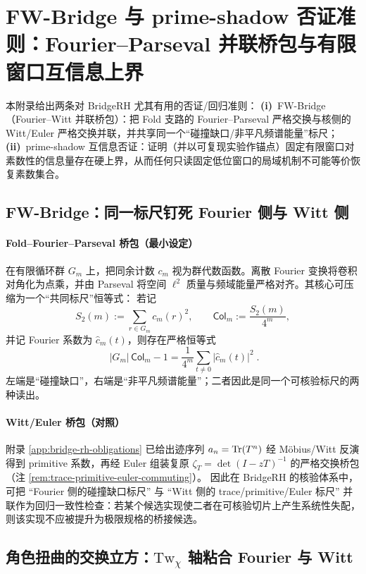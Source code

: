 \section{FW-Bridge 与 prime-shadow 否证准则：Fourier--Parseval 并联桥包与有限窗口互信息上界}\label{app:fw-bridge-and-prime-shadow}

本附录给出两条对 BridgeRH 尤其有用的否证/回归准则：
\textbf{(i)}~FW-Bridge（Fourier--Witt 并联桥包）：把 Fold 支路的 Fourier--Parseval 严格交换与核侧的 Witt/Euler 严格交换并联，并共享同一个“碰撞缺口/非平凡频谱能量”标尺；
\textbf{(ii)}~prime-shadow 互信息否证：证明（并以可复现实验作锚点）固定有限窗口对素数性的信息量存在硬上界，从而任何只读固定低位窗口的局域机制不可能等价恢复素数集合。

\subsection{FW-Bridge：同一标尺钉死 Fourier 侧与 Witt 侧}\label{subsec:fw-bridge}

\paragraph{Fold--Fourier--Parseval 桥包（最小设定）}
在有限循环群 \(G_m\) 上，把同余计数 \(c_m\) 视为群代数函数。离散 Fourier 变换将卷积对角化为点乘，并由 Parseval 将空间 \(\ell^2\) 质量与频域能量严格对齐。其核心可压缩为一个“共同标尺”恒等式：
若记
$$
S_2(m):=\sum_{r\in G_m} c_m(r)^2,\qquad
\mathsf{Col}_m:=\frac{S_2(m)}{4^m},
$$
并记 Fourier 系数为 \(\widehat c_m(t)\)，则存在严格恒等式
$$
\boxed{\;
|G_m|\,\mathsf{Col}_m-1=\frac{1}{4^m}\sum_{t\ne 0}\bigl|\widehat c_m(t)\bigr|^2\; }.
$$
左端是“碰撞缺口”，右端是“非平凡频谱能量”；二者因此是同一个可核验标尺的两种读出。

\paragraph{Witt/Euler 桥包（对照）}
附录 \ref{app:bridge-rh-obligations} 已给出迹序列 \(a_n=\mathrm{Tr}(T^n)\) 经 Möbius/Witt 反演得到 primitive 系数，再经 Euler 组装复原 \(\zeta_T=\det(I-zT)^{-1}\) 的严格交换桥包（注 \ref{rem:trace-primitive-euler-commuting}）。
因此在 BridgeRH 的核验体系中，可把 “Fourier 侧的碰撞缺口标尺” 与 “Witt 侧的 trace/primitive/Euler 标尺” 并联作为回归一致性检查：若某个候选实现使二者在可核验切片上产生系统性失配，则该实现不应被提升为极限规格的桥接候选。

\subsection{角色扭曲的交换立方：\texorpdfstring{$\mathrm{Tw}_\chi$}{Tw_chi} 轴粘合 Fourier 与 Witt}\label{subsec:twist-commuting-cube}

